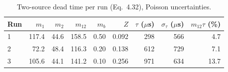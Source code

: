 \begin{table}[htbp]
\centering
\caption{Two-source dead time per run (Eq.~4.32), Poisson uncertainties.}
\label{tab:tau-runs}
\begin{tabular}{lrrrrrrrr}
\toprule
Run & $m_1$ & $m_2$ & $m_{12}$ & $m_b$ & $Z$ & $\tau$ ($\mu$s) & $\sigma_\tau$ ($\mu$s) & $m_{12}\tau$ (\%) \\
\midrule
1 & 117.4 & 44.6 & 158.5 & 0.50 & 0.092 & 298 & 566 & 4.7 \\
2 & 72.2 & 48.4 & 116.3 & 0.20 & 0.138 & 612 & 729 & 7.1 \\
3 & 105.6 & 44.1 & 141.2 & 0.10 & 0.256 & 971 & 634 & 13.7 \\
\bottomrule
\end{tabular}
\end{table}
